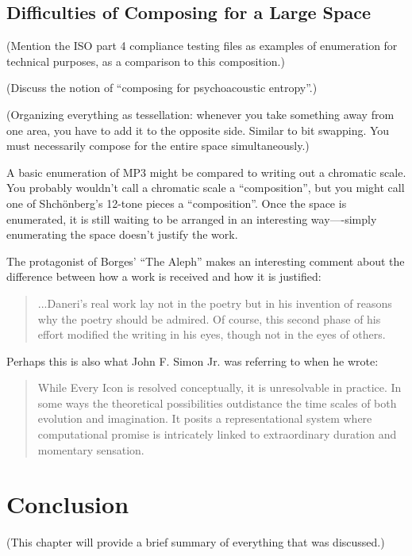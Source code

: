 \documentclass{thesis}
\begin{document}
\section{Difficulties of Composing for a Large Space}

	(Mention the ISO part 4 compliance testing files as examples of enumeration for technical purposes, as a comparison to this composition.)
	
	(Discuss the notion of ``composing for psychoacoustic entropy''.)
	
	(Organizing everything as tessellation: whenever you take something away from one area, you have to add it to the opposite side. Similar to bit swapping. You must necessarily compose for the entire space simultaneously.)
	
	A basic enumeration of MP3 might be compared to writing out a chromatic scale. You probably wouldn't call a chromatic scale a ``composition'', but you might call one of Shch\"onberg's 12-tone pieces a ``composition''. Once the space is enumerated, it is still waiting to be arranged in an interesting way----simply enumerating the space doesn't justify the work.

	The protagonist of Borges' ``The Aleph'' makes an interesting comment about the difference between how a work is received and how it is justified:
	
	\begin{quote}
	...Daneri's real work lay not in the poetry but in his invention of reasons why the poetry should be admired. Of course, this second phase of his effort modified the writing in his eyes, though not in the eyes of others.
	\end{quote}
	
	Perhaps this is also what John F. Simon Jr. was referring to when he wrote:
	
	\begin{quote}
	While Every Icon is resolved conceptually, it is unresolvable in practice. In some ways the theoretical possibilities outdistance the time scales of both evolution and imagination. It posits a representational system where computational promise is intricately linked to extraordinary duration and momentary sensation.\cite{john_f._simon_jr._given:32_1997}
	\end{quote}
	
\chapter{Conclusion}
	(This chapter will provide a brief summary of everything that was discussed.)
\end{document}
